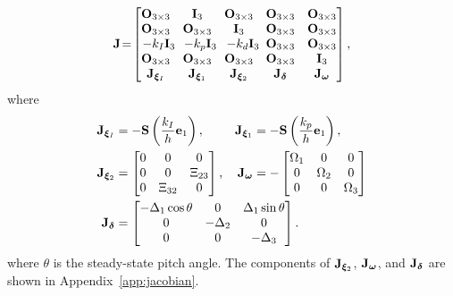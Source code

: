 \begin{equation}
    \mat{J} \!=\! \begin{bmatrix}
        \mat{O}_{3 \times 3} & \mat{I}_{3} & \mat{O}_{3 \times 3} & \mat{O}_{3 \times 3} & \mat{O}_{3 \times 3} \\
        \mat{O}_{3 \times 3} & \mat{O}_{3 \times 3} & \mat{I}_{3} & \mat{O}_{3 \times 3} & \mat{O}_{3 \times 3} \\
        -k_I \mat{I}_{3}\!\!\! & -k_p \mat{I}_{3}\!\!\! & -k_d \mat{I}_{3}\!\!\!\! & \mat{O}_{3 \times 3} & \mat{O}_{3 \times 3} \\
        \mat{O}_{3 \times 3} & \mat{O}_{3 \times 3} & \mat{O}_{3 \times 3} & \mat{O}_{3 \times 3} & \mat{I}_{3} \\
        \mat{J}_{\bs{\xi}_I} & \mat{J}_{\bs{\xi}_1} & \mat{J}_{\bs{\xi}_2} & \mat{J}_{\bs{\delta}} & \mat{J}_{\bs{\omega}}
    \end{bmatrix}, \label{eq:handpos_trajectory_jacobian}
\end{equation}
where
\begin{subequations}
    \begin{align}
        \mat{J}_{\bs{\xi}_I} &= -\mat{S}\left(\frac{k_I}{h}\mat{e}_1\right), &
        \mat{J}_{\bs{\xi}_1} &= -\mat{S}\left(\frac{k_p}{h}\mat{e}_1\right), \\
        \mat{J}_{\bs{\xi}_2} &= \begin{bmatrix}
            0 & 0 & 0 \\
            0 & 0 & {\Xi}_{23} \\
            0 & {\Xi}_{32} & 0
        \end{bmatrix}, &
        \mat{J}_{\bs{\omega}} &= - \begin{bmatrix}
            \Omega_1 & 0 & 0 \\
            0 & \Omega_2 & 0 \\
            0 & 0 & \Omega_3
        \end{bmatrix} \\            
        \mat{J}_{\bs{\delta}} &= \mathrlap{\begin{bmatrix}
            -\Delta_1\cos\theta & 0 & \Delta_1\sin\theta \\
            0 & -\Delta_2 & 0 \\
            0 & 0 & -\Delta_3
        \end{bmatrix}.}            
    \end{align}
    \label{eq:handpos_trajectory_jacobian_blocks}
\end{subequations}
where $\theta$ is the steady-state pitch angle.
The components of $\mathbf{J}_{\bm{\xi}_2}$, $\mathbf{J}_{\bm{\omega}}$, and $\mathbf{J}_{\bm{\delta}}$ are shown in Appendix~\ref{app:jacobian}.

